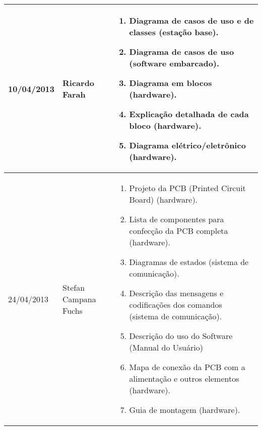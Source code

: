 \begin{table}[h]
  \centering
  \begin{tabular}{|p{3cm}|p{4cm}|p{7cm}|}
    10/04/2013 & Ricardo Farah & 
    \begin{enumerate}[topsep=0pt, partopsep=0pt, itemsep=0pt]
      \item Diagrama de casos de uso e de classes (estação base).
      \item Diagrama de casos de uso (software embarcado).
      \item Diagrama em blocos (hardware).
      \item Explicação detalhada de cada bloco (hardware).
      \item Diagrama elétrico/eletrônico (hardware).
    \end{enumerate}\\
    \hline
    24/04/2013 & Stefan Campana Fuchs & 
    \begin{enumerate}[topsep=0pt, partopsep=0pt, itemsep=0pt]
      \item Projeto da PCB (Printed Circuit Board) (hardware).
      \item Lista de componentes para confecção da PCB completa (hardware).
      \item Diagramas de estados (sistema de comunicação).
      \item Descrição das mensagens e codificações dos comandos (sistema de comunicação).
      \item Descrição do uso do Software (Manual do Usuário)
      \item Mapa de conexão da PCB com a alimentação e outros elementos (hardware).
      \item Guia de montagem (hardware).
    \end{enumerate}\\
    \bottomrule
  \end{tabular}%
  \label{tab:deliverables2}%
\end{table}%